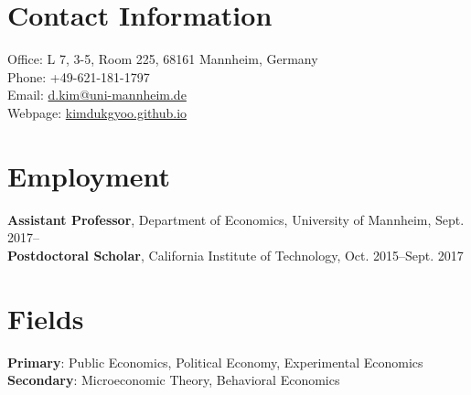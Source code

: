 \documentclass[margin]{res}
\begin{document}
 

\begin{resume} 
\section{Contact Information} Office: L 7, 3-5, Room 225, 68161 Mannheim, Germany\\
Phone: +49-621-181-1797\\
Email: \href{mailto:d.kim@uni-mannheim.de}{d.kim@uni-mannheim.de}\\
Webpage: \url{kimdukgyoo.github.io}

\section{Employment}
\textbf{Assistant Professor}, Department of Economics, University of Mannheim, Sept. 2017--\\
\textbf{Postdoctoral Scholar}, California Institute of Technology, Oct. 2015--Sept. 2017%

\section{Fields}
\textbf{Primary}: Public Economics, Political Economy, Experimental Economics\\
\textbf{Secondary}: Microeconomic Theory, Behavioral Economics


\end{resume}
\end{document}
